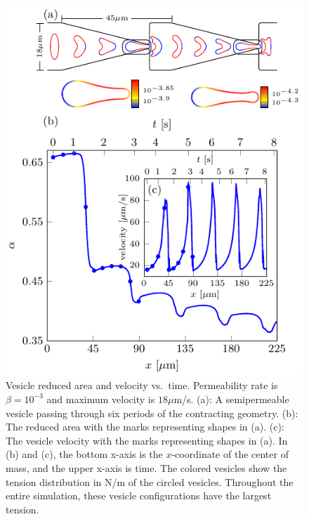 \documentclass[9pt,twocolumn,twoside,lineno]{pnas-new}
\newif\ifTikz
\begin{document}
\begin{figure}[htp]
  \ifTikz
  
  \else
  \includegraphics{figures/contractingComposite2.pdf}
  \fi
  \caption{\label{fig:contractingComposite2} Vesicle reduced area and
  velocity vs.~time. Permeability rate is $\beta = 10^{-3}$ and maximum
  velocity is $18\mu$m/s. (a): A semipermeable vesicle passing through
  six periods of the contracting geometry. (b): The reduced area with
  the marks representing shapes in (a). (c): The vesicle velocity with
  the marks representing shapes in (a). In (b) and (c), the bottom
  x-axis is the $x$-coordinate of the center of mass, and the upper
  x-axis is time. The colored vesicles show the tension distribution in
  N/m of the circled vesicles. Throughout the entire simulation, these
  vesicle configurations have the largest tension.}
\end{figure}
\end{document}
